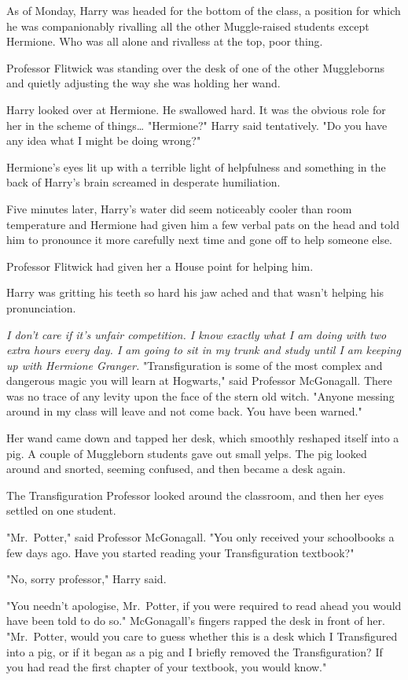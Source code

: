 As of Monday, Harry was headed for the bottom of the class, a position for 
which he was companionably rivalling all the other Muggle-raised students 
except Hermione. Who was all alone and rivalless at the top, poor thing.

Professor Flitwick was standing over the desk of one of the other Muggleborns 
and quietly adjusting the way she was holding her wand.

Harry looked over at Hermione. He swallowed hard. It was the obvious role for 
her in the scheme of things{\ldots} "Hermione?" Harry said tentatively. "Do you 
have any idea what I might be doing wrong?"

Hermione's eyes lit up with a terrible light of helpfulness and something in 
the back of Harry's brain screamed in desperate humiliation.

Five minutes later, Harry's water did seem noticeably cooler than room 
temperature and Hermione had given him a few verbal pats on the head and told 
him to pronounce it more carefully next time and gone off to help someone else.

Professor Flitwick had given her a House point for helping him.

Harry was gritting his teeth so hard his jaw ached and that wasn't helping his 
pronunciation.

\emph{I don't care if it's unfair competition. I know exactly what I am doing 
with two extra hours every day. I am going to sit in my trunk and study until I 
am keeping up with Hermione Granger.}
\sbreak
"Transfiguration is some of the most complex and dangerous magic you will learn 
at Hogwarts," said Professor McGonagall. There was no trace of any levity upon 
the face of the stern old witch. "Anyone messing around in my class will leave 
and not come back. You have been warned."

Her wand came down and tapped her desk, which smoothly reshaped itself into a 
pig. A couple of Muggleborn students gave out small yelps. The pig looked 
around and snorted, seeming confused, and then became a desk again.

The Transfiguration Professor looked around the classroom, and then her eyes 
settled on one student.

"Mr.~Potter," said Professor McGonagall. "You only received your schoolbooks a 
few days ago. Have you started reading your Transfiguration textbook?"

"No, sorry professor," Harry said.

"You needn't apologise, Mr.~Potter, if you were required to read ahead you 
would have been told to do so." McGonagall's fingers rapped the desk in front 
of her. "Mr.~Potter, would you care to guess whether this is a desk which I 
Transfigured into a pig, or if it began as a pig and I briefly removed the 
Transfiguration? If you had read the first chapter of your textbook, you would 
know."

